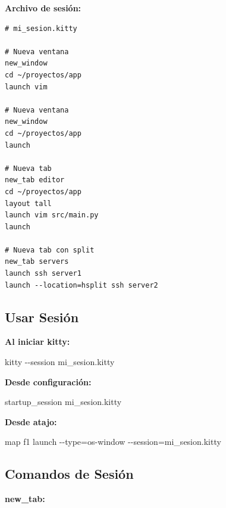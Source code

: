 \documentclass[
  doc,
  floatsintext,
  longtable,
  a4paper,
  nolmodern,
  notxfonts,
  notimes,
  12pt,
  colorlinks=true,linkcolor=blue,citecolor=blue,urlcolor=blue]{apa7}
\newenvironment{Shaded}{\begin{snugshade}}{\end{snugshade}}
\newcommand{\AttributeTok}[1]{\textcolor[rgb]{0.40,0.45,0.13}{#1}}
\newcommand{\DataTypeTok}[1]{\textcolor[rgb]{0.68,0.00,0.00}{#1}}
\newcommand{\ExtensionTok}[1]{\textcolor[rgb]{0.00,0.23,0.31}{#1}}
\newcommand{\NormalTok}[1]{\textcolor[rgb]{0.00,0.23,0.31}{#1}}
\newcommand{\OperatorTok}[1]{\textcolor[rgb]{0.37,0.37,0.37}{#1}}
\begin{document}
\textbf{Archivo de sesión:}

\begin{verbatim}
# mi_sesion.kitty

# Nueva ventana
new_window
cd ~/proyectos/app
launch vim

# Nueva ventana
new_window
cd ~/proyectos/app
launch

# Nueva tab
new_tab editor
cd ~/proyectos/app
layout tall
launch vim src/main.py
launch

# Nueva tab con split
new_tab servers
launch ssh server1
launch --location=hsplit ssh server2
\end{verbatim}

\subsection{Usar Sesión}\label{usar-sesiuxf3n}

\textbf{Al iniciar kitty:}

\begin{Shaded}
\begin{Highlighting}[]
\ExtensionTok{kitty} \AttributeTok{{-}{-}session}\NormalTok{ mi\_sesion.kitty}
\end{Highlighting}
\end{Shaded}

\textbf{Desde configuración:}

\begin{Shaded}
\begin{Highlighting}[]
\DataTypeTok{startup\_session} \DataTypeTok{mi\_sesion.kitty}
\end{Highlighting}
\end{Shaded}

\textbf{Desde atajo:}

\begin{Shaded}
\begin{Highlighting}[]
\DataTypeTok{map} \DataTypeTok{f1} \DataTypeTok{launch} \DataTypeTok{{-}{-}type}\OperatorTok{=}\DataTypeTok{os{-}window} \DataTypeTok{{-}{-}session}\OperatorTok{=}\DataTypeTok{mi\_sesion.kitty}
\end{Highlighting}
\end{Shaded}

\subsection{Comandos de Sesión}\label{comandos-de-sesiuxf3n}

\textbf{new\_tab:}
\end{document}
